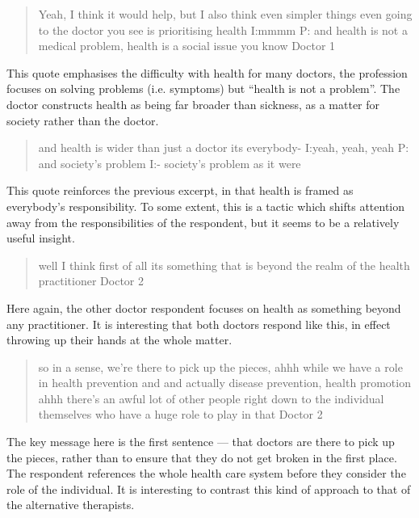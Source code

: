 \begin{quotation}
  Yeah, I think it would help, but I also think even simpler things even going to the doctor you see is prioritising health
I:mmmm
P: and health is not a medical problem, health is a social issue you know
Doctor 1
\end{quotation}

This quote emphasises the difficulty with health for many doctors, the profession focuses on solving problems (i.e. symptoms) but ``health is not a problem''. The doctor constructs health as being far broader than sickness, as a matter for society rather than the doctor. 

\begin{quotation}
  and health is wider than just a doctor its everybody-
I:yeah, yeah, yeah
P: and society's problem 
I:- society's problem as it were

\end{quotation}

This quote reinforces the previous excerpt, in that health is framed as everybody's responsibility. To some extent, this is a tactic which shifts attention away from the responsibilities of the respondent, but it seems to be a relatively useful insight. 

\begin{quotation}
  well I think first of all its something that is beyond the realm of the health practitioner 
Doctor 2
\end{quotation}

Here again, the other doctor respondent focuses on health as something beyond any practitioner. It is interesting that both doctors respond like this, in effect throwing up their hands at the whole matter. 

\begin{quotation}
  so in a sense, we're there to pick up the pieces, ahhh while we have a role in health prevention and and actually disease prevention, health promotion ahhh there's an awful lot of other people right down to the individual themselves who have a huge role to play in that
Doctor 2
\end{quotation}

The key message here is the first sentence --- that doctors are there to pick up the pieces, rather than to ensure that they do not get broken in  the first place. The respondent references the whole health care system before they consider the role of the individual. It is interesting to contrast this kind of approach to that of the alternative therapists. 


